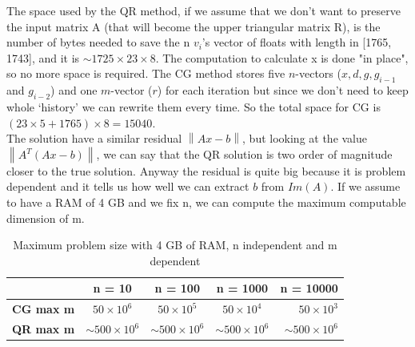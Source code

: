 \documentclass{article}
\begin{document}
The space used by the QR method, if we assume that we don't want to preserve the input matrix A (that will become the upper triangular matrix R), is the number of bytes needed to save the n $v_{i}$'s vector of floats with length in [1765, 1743], and it is $\sim 1725 \times 23 \times 8$.
The computation to calculate x is done "in place", so no more space is required.
The CG method stores five $n$-vectors ($x, d, g, g_{i-1}$ and $g_{i-2}$) and one $m$-vector ($r$) for each iteration but since we don't need to keep whole ‘history’ we can rewrite them every time.
So the total space for CG is $(23\times5 + 1765)\times8 = 15040$.
\\The solution have a similar residual $\left\lVert Ax - b \right\rVert$, but looking at the value $\left\lVert A^{T}(Ax - b)\right\rVert$, we can say that the QR solution is two order of magnitude closer to the true solution.
Anyway the residual is quite big because it is problem dependent and it tells us how well we can extract $b$ from $Im(A)$.
If we assume to have a RAM of 4 GB and we fix n, we can compute the maximum computable dimension of m.
\begin{table}[h!]
    \begin{center}
        \caption{Maximum problem size with 4 GB of RAM, n independent and m dependent}
        \label{tab:table5}
        \begin{tabular}{l|c|c|c|r}
            \textbf{} & \textbf{n = 10} & \textbf{n = 100} & \textbf{n = 1000} & \textbf{n = 10000}\\
            \hline
            \textbf{CG max m} & $50 \times 10^{6}$ & $50 \times 10^{5}$ & $50 \times 10^{4}$ & $50 \times 10^{3}$\\
            \textbf{QR max m} & $\sim 500 \times 10^{6}$ & $\sim 500 \times 10^{6}$ & $\sim 500 \times 10^{6}$ & $\sim 500 \times 10^{6}$
        \end{tabular}
    \end{center}
\end{table}
\end{document}
